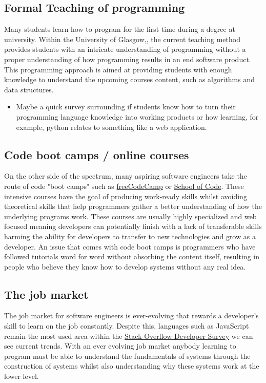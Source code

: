 \documentclass{l4proj}
\begin{document}
\subsection{Formal Teaching of programming}
Many students learn how to program for the first time during a degree at university. Within the University of Glasgow,, the current teaching method provides students with an intricate understanding of programming without a proper understanding of how programming results in an end software product. This programming approach is aimed at providing students with enough knowledge to understand the upcoming courses content, such as algorithms and data structures.
\begin{itemize}
    \item Maybe a quick survey surrounding if students know how to turn their programming language knowledge into working products or how learning, for example, python relates to something like a web application.
\end{itemize}


\subsection{Code boot camps / online courses}
On the other side of the spectrum, many aspiring software engineers take the route of code "boot camps" such as \href{https://www.freecodecamp.org/}{freeCodeCamp} or \href{https://www.schoolofcode.co.uk/}{School of Code}. These intensive courses have the goal of producing work-ready skills whilst avoiding theoretical skills that help programmers gather a better understanding of how the underlying programs work. These courses are usually highly specialized and web focused meaning developers can potentially finish with a lack of transferable skills harming the ability for developers to transfer to new technologies and grow as a developer. An issue that comes with code boot camps is programmers who have followed tutorials word for word without absorbing the content itself, resulting in people who believe they know how to develop systems without any real idea.

\subsection{The job market}
The job market for software engineers is ever-evolving that rewards a developer's skill to learn on the job constantly. Despite this, languages such as JavaScript remain the most used area within the \href{https://survey.stackoverflow.co/2022/#technology-most-popular-technologies}{Stack Overflow Developer Survey} we can see current trends. With an ever evolving job market anybody learning to program must be able to understand the fundamentals of systems through the construction of systems whilst also understanding why these systems work at the lower level.
\end{document}
